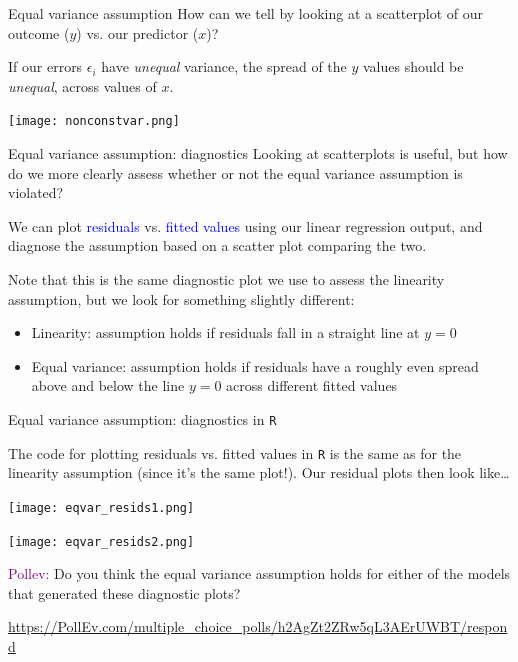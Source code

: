 \documentclass[10pt,t]{beamer}
\begin{document}
\begin{frame}{Equal variance assumption}
How can we tell by looking at a scatterplot of our outcome ($y$) vs. our predictor ($x$)?

\vspace{0.3cm}

If our errors $\epsilon_i$ have \textit{unequal} variance, the spread of the $y$ values should be \textit{unequal}, across values of $x$.

\vspace{0.3cm}
\centering

\texttt{[image: nonconstvar.png]}

\end{frame}

\begin{frame}{Equal variance assumption: diagnostics}
Looking at scatterplots is useful, but how do we more clearly assess whether or not the equal variance assumption is violated?

\vspace{0.3cm}

We can plot \textcolor{blue}{residuals} vs. \textcolor{blue}{fitted values} using our linear regression output, and diagnose the assumption based on a scatter plot comparing the two.

\vspace{0.3cm}

Note that this is the same diagnostic plot we use to assess the linearity assumption, but we look for something slightly different:

\vspace{0.3cm}

\begin{itemize}
	\item Linearity: assumption holds if residuals fall in a straight line at $y = 0$
	\item Equal variance: assumption holds if residuals have a roughly even spread above and below the line $y = 0$ across different fitted values
\end{itemize}

\end{frame}


\begin{frame}{Equal variance assumption: diagnostics in \texttt{R}}
	\vspace{-5 mm}
	
The code for plotting residuals vs. fitted values in \texttt{R} is the same as for the linearity assumption (since it's the same plot!). Our residual plots then look like\dots

\centering

\texttt{[image: eqvar\_resids1.png]}

\texttt{[image: eqvar\_resids2.png]} \pause

\textcolor{purple}{Pollev:} Do you think the equal variance assumption holds for either of the models that generated these diagnostic plots?
\smallskip

\footnotesize{\url{https://PollEv.com/multiple_choice_polls/h2AgZt2ZRw5qL3AErUWBT/respond}}

\end{frame}
\end{document}

